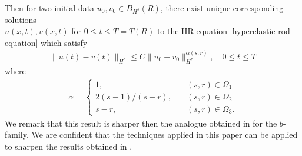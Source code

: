 \documentclass[12pt,reqno]{amsart}
\numberwithin{equation}{section}  %
\numberwithin{figure}{section}
\begin{document}
%
\begin{center}
\end{center}
%
%
Then for two initial data $u_{0}, v_{0} \in B_{H^{s}}(R)$, there exist unique
corresponding solutions \\ $u(x,t), v(x,t)$ for $0 \le t \le T= T(R)$ to the
HR equation \eqref{hyperelastic-rod-equation} which satisfy 
%
%
\begin{equation*}
\begin{split}
\| u(t) - v(t) \|_{H^{r}} \le C \| u_{0} - v_{0} \|_{H^{r}}^{\alpha(s, r)},
\quad 0
\le t \le T
\end{split}
\end{equation*}
%
%
where 
%
%
\begin{equation*}
\begin{split}
\alpha = 
\begin{cases}
1, \quad & (s,r) \in \Omega_{1} 
\\
2(s-1)/(s-r),  \quad & (s, r) \in \Omega_{2}
\\
s-r, \quad & (s, r) \in \Omega_{3}.
\end{cases}
\end{split}
\end{equation*}
%
%
%
%
%
%
%
%
We remark that this result is sharper then the analogue obtained in
\cite{Chen:2011aa} for the $b$-family. We are confident that the techniques
applied in this paper can be applied to sharpen the results obtained in
\cite{Chen:2011aa}.
%
%
%
\end{document}

